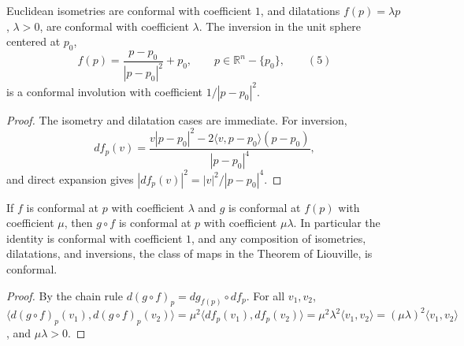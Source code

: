 \begin{example}
  \label{ex:dc-ch8-5-1}
  \leanok
  Euclidean isometries are conformal with coefficient $1$, and dilatations
  $f(p)=\lambda p$, $\lambda>0$, are conformal with coefficient $\lambda$. The
  inversion in the unit sphere centered at $p_0$,
  $$
  f(p)=\frac{p-p_0}{|p-p_0|^2}+p_0,\qquad p\in\mathbb{R}^n-\{p_0\},\qquad(5)
  $$
  is a conformal involution with coefficient $1/|p-p_0|^2$.
\end{example}
\begin{proof}
  \sketch
  The isometry and dilatation cases are immediate. For inversion,
  $$
  df_p(v)=\frac{v|p-p_0|^2-2\langle v,p-p_0\rangle(p-p_0)}{|p-p_0|^4},
  $$
  and direct expansion gives
  $|df_p(v)|^2=|v|^2/|p-p_0|^4$.
\end{proof}

\begin{lemma}
  \label{lem:dc-ch8-5-conformal-comp}
  \leanok
  If $f$ is conformal at $p$ with coefficient $\lambda$ and $g$ is conformal at
  $f(p)$ with coefficient $\mu$, then $g\circ f$ is conformal at $p$ with
  coefficient $\mu\lambda$. In particular the identity is conformal with
  coefficient $1$, and any composition of isometries, dilatations, and inversions,
  the class of maps in the Theorem of Liouville, is conformal.
\end{lemma}
\begin{proof}
  \leanok
\sketch
  By the chain rule $d(g\circ f)_p=dg_{f(p)}\circ df_p$. For all $v_1,v_2$,
  $\langle d(g\circ f)_p(v_1),d(g\circ f)_p(v_2)\rangle
  =\mu^2\langle df_p(v_1),df_p(v_2)\rangle
  =\mu^2\lambda^2\langle v_1,v_2\rangle=(\mu\lambda)^2\langle v_1,v_2\rangle$,
  and $\mu\lambda>0$.
\end{proof}

